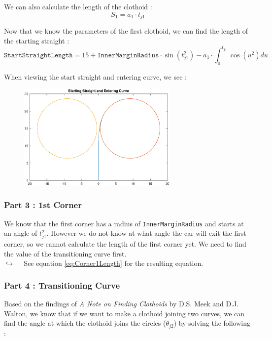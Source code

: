 \documentclass[a4paper, 11pt]{article}
\begin{document}
We can also calculate the length of the clothoid :
\begin{equation}
	S_1 = a_1\cdot t_{j1}
\end{equation}

Now that we know the parameters of the first clothoid, we can find the length of the starting straight :
\begin{equation}
	\texttt{StartStraightLength} = 15 + \texttt{InnerMarginRadius}\cdot\sin\left(t_{j1}^2 \right) - a_1 \cdot \int_0^{t_{j1}} \cos\left(u^2 \right)du
	\label{eq:StartStraightLengthResult}
\end{equation}

When viewing the start straight and entering curve, we see :
\begin{figure}[H]
	\centering
	\includegraphics[trim = 1.9cm 2cm 1.3cm 1.5cm, clip, width = 0.7\textwidth]{Figures/StartStraightEnteringCurve.eps}
	\caption{ }
	\label{fig:StartStraightEnteringCurve}
\end{figure}

\subsubsection{Part 3 : 1st Corner}

We know that the first corner has a radius of \texttt{InnerMarginRadius} and starts at an angle of $t_{j1}^2$. However we do not know at what angle the car will exit the first corner, so we cannot calculate the length of the first corner yet. We need to find the value of the transitioning curve first.\\

$\hookrightarrow\quad$ See equation \ref{eq:Corner1Length} for the resulting equation.

\subsubsection{Part 4 : Transitioning Curve}
Based on the findings of \textit{A Note on Finding Clothoids} by D.S. Meek and D.J. Walton, we know that if we want to make a clothoid joining two curves, we can find the angle at which the clothoid joins the circles ($\theta_{j2}$) by solving the following :
\end{document}
